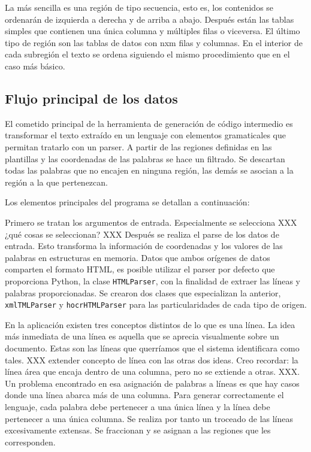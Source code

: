 La más sencilla es una región de tipo secuencia, esto es, los contenidos se ordenarán de izquierda a derecha y de arriba a abajo. Después están las tablas simples que contienen una única columna y múltiples filas o viceversa. El último tipo de región son las tablas de datos con nxm filas y columnas. En el interior de cada subregión el texto se ordena siguiendo el mismo procedimiento que en el caso más básico.


\subsection{Flujo principal de los datos}

El cometido principal de la herramienta de generación de código intermedio es transformar el texto extraído en un lenguaje con elementos gramaticales que permitan tratarlo con un parser. A partir de las regiones definidas en las plantillas y las coordenadas de las palabras se hace un filtrado. Se descartan todas las palabras que no encajen en ninguna región, las demás se asocian a la región a la que pertenezcan.

Los elementos principales del programa se detallan a continuación:

Primero se tratan los argumentos de entrada. Especialmente se selecciona XXX ¿qué cosas se seleccionan? XXX
Después se realiza el parse de los datos de entrada. Esto transforma la información de coordenadas y los valores de las palabras en estructuras en memoria. Datos que ambos orígenes de datos comparten el formato HTML, es posible utilizar el parser por defecto que proporciona Python, la clase \verb|HTMLParser|, con la finalidad de extraer las líneas y palabras proporcionadas. Se crearon dos clases que especializan la anterior, \verb|xmlTMLParser| y \verb|hocrHTMLParser| para las particularidades de cada tipo de origen.

En la aplicación existen tres conceptos distintos de lo que es una línea. La idea más inmediata de una línea es aquella que se aprecia visualmente sobre un documento. Estas son las líneas que querríamos que el sistema identificara como tales. XXX extender concepto de línea con las otras dos ideas. Creo recordar: la línea área que encaja dentro de una columna, pero no se extiende a otras. XXX. Un problema encontrado en esa asignación de palabras a líneas es que hay casos donde una línea abarca más de una columna. Para generar correctamente el lenguaje, cada palabra debe pertenecer a una única línea y la línea debe pertenecer a una única columna. Se realiza por tanto un troceado de las líneas excesivamente extensas. Se fraccionan y se asignan a las regiones que les corresponden.

